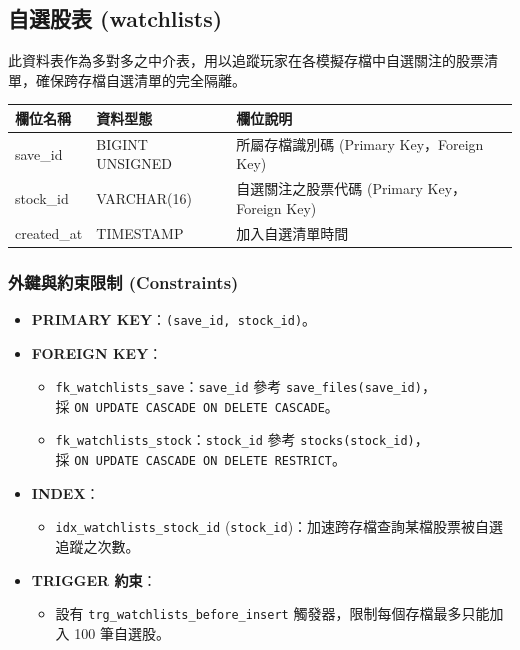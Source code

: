 \documentclass[UTF8, a4paper, 12pt, fontset=none]{ctexart}
\begin{document}
    \subsection{自選股表 (watchlists)}
    

    此資料表作為多對多之中介表，用以追蹤玩家在各模擬存檔中自選關注的股票清單，確保跨存檔自選清單的完全隔離。

    \begin{center}
    \begin{tabular}{|l|l|p{8cm}|}
    \hline
    \textbf{欄位名稱} & \textbf{資料型態} & \textbf{欄位說明} \\ \hline
    save\_id & BIGINT UNSIGNED & 所屬存檔識別碼 (Primary Key，Foreign Key) \\ \hline
    stock\_id & VARCHAR(16) & 自選關注之股票代碼 (Primary Key，Foreign Key) \\ \hline
    created\_at & TIMESTAMP & 加入自選清單時間 \\ \hline
    \end{tabular}
    \end{center}

    \subsubsection*{外鍵與約束限制 (Constraints)}
    \begin{itemize}
        \item \textbf{PRIMARY KEY}：\texttt{(save\_id, stock\_id)}。
        \item \textbf{FOREIGN KEY}：
            \begin{itemize}
                \item \texttt{fk\_watchlists\_save}：\texttt{save\_id} 參考 \texttt{save\_files(save\_id)}，\\採 \texttt{ON UPDATE CASCADE ON DELETE CASCADE}。
                \item \texttt{fk\_watchlists\_stock}：\texttt{stock\_id} 參考 \texttt{stocks(stock\_id)}，\\採 \texttt{ON UPDATE CASCADE ON DELETE RESTRICT}。
            \end{itemize}
        \item \textbf{INDEX}：
            \begin{itemize}
                \item \texttt{idx\_watchlists\_stock\_id} (\texttt{stock\_id})：加速跨存檔查詢某檔股票被自選追蹤之次數。
            \end{itemize}
        \item \textbf{TRIGGER 約束}：
            \begin{itemize}
                \item 設有 \texttt{trg\_watchlists\_before\_insert} 觸發器，限制每個存檔最多只能加入 100 筆自選股。
            \end{itemize}
    \end{itemize}
\end{document}
